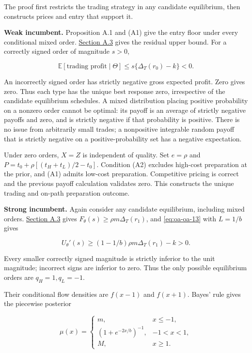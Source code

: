 \documentclass[
  11pt,
]{article}
\begin{document}
The proof first restricts the trading strategy in any candidate
equilibrium, then constructs prices and entry that support it.

\textbf{Weak incumbent.} Proposition A.1 and (A1) give the entry floor
under every conditional mixed order. \hyperref[oa-a-inference]{Section
A.3} gives the residual upper bound. For a correctly signed order of
magnitude \(s>0\),

\[
\mathbb E[\text{trading profit}\mid\Theta]\le s\{\Delta_T(r_0)-k\}<0.
\tag{OA.14}\label{eq:oa-oa-14}
\]

An incorrectly signed order has strictly negative gross expected profit.
Zero gives zero. Thus each type has the unique best response zero,
irrespective of the candidate equilibrium schedules. A mixed
distribution placing positive probability on a nonzero order cannot be
optimal: its payoff is an average of strictly negative payoffs and zero,
and is strictly negative if that probability is positive. There is no
issue from arbitrarily small trades; a nonpositive integrable random
payoff that is strictly negative on a positive-probability set has a
negative expectation.

Under zero orders, \(X=Z\) is independent of quality. Set \(e=\rho\) and
\(P=t_0+\rho[(t_H+t_L)/2-t_0]\). Condition (A2) excludes high-cost
preparation at the prior, and (A1) admits low-cost preparation.
Competitive pricing is correct and the previous payoff calculation
validates zero. This constructs the unique trading and on-path
preparation outcome.

\textbf{Strong incumbent.} Again consider any candidate equilibrium,
including mixed orders. \hyperref[oa-a-inference]{Section A.3} gives
\(F_\theta(s)\ge\rho m\Delta_T(r_1)\), and \eqref{eq:oa-oa-13} with
\(L=1/b\) gives

\[
U_\theta'(s)\ge(1-1/b)\rho m\Delta_T(r_1)-k>0.
\tag{OA.15}\label{eq:oa-oa-15}
\]

Every smaller correctly signed magnitude is strictly inferior to the
unit magnitude; incorrect signs are inferior to zero. Thus the only
possible equilibrium orders are \(q_H=1,q_L=-1\).

Their conditional flow densities are \(f(x-1)\) and \(f(x+1)\). Bayes'
rule gives the piecewise posterior

\[
\mu(x)=
\begin{cases}
m,&x\le-1,\\
(1+e^{-2x/b})^{-1},&-1<x<1,\\
M,&x\ge1.
\end{cases}
\tag{OA.16}\label{eq:oa-oa-16}
\]
\end{document}
